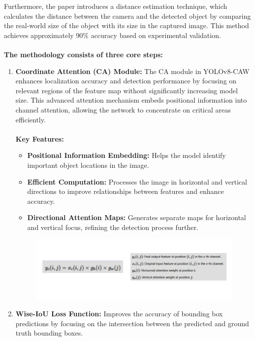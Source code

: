 {%
%
Furthermore, the paper introduces a distance estimation technique, which calculates the distance between the camera and the detected object by comparing the real-world size of the object with its size in the captured image. This method achieves approximately 90\% accuracy based on experimental validation.\\\\
%
%
\textbf{The methodology consists of three core steps:}
\begin{enumerate}
  \item \textbf{Coordinate Attention (CA) Module:} The CA module in YOLOv8-CAW enhances localization accuracy and detection performance by focusing on relevant regions of the feature map without significantly increasing model size. This advanced attention mechanism embeds positional information into channel attention, allowing the network to concentrate on critical areas efficiently.
\\\\
\textbf{Key Features:}
\begin{itemize}
    \item \textbf{Positional Information Embedding:} Helps the model identify important object locations in the image.
    \item \textbf{Efficient Computation:} Processes the image in horizontal and vertical directions to improve relationships between features and enhance accuracy.
    \item \textbf{Directional Attention Maps:} Generates separate maps for horizontal and vertical focus, refining the detection process further.
\end{itemize}
%  
% 
\begin{figure}[h!]
    \centering
    \includegraphics[width=1\textwidth]{images/CA Eqn.png}
\end{figure}
%
%
  \item \textbf{Wise-IoU Loss Function:} Improves the accuracy of bounding box predictions by focusing on the intersection between the predicted and ground truth bounding boxes.\\\\
  

\end{enumerate}}

